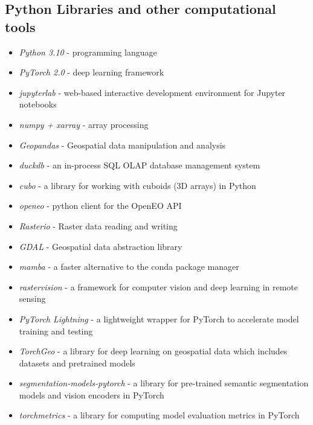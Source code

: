 \begin{multicols}{2}
\subsection{Python Libraries and other computational tools}
\begin{itemize}
    \item \textit{Python 3.10} - programming language  
    \item \textit{PyTorch 2.0} - deep learning framework 
    \item \textit{jupyterlab} - web-based interactive development environment for Jupyter notebooks
    \item \textit{numpy + xarray} - array processing
    \item \textit{Geopandas} - Geospatial data manipulation and analysis
    \item \textit{duckdb} - an in-process SQL OLAP database management system
    \item \textit{cubo} - a library for working with cuboids (3D arrays) in Python
    \item \textit{openeo} - python client for the OpenEO API
    \item \textit{Rasterio} - Raster data reading and writing
    \item \textit{GDAL} - Geospatial data abstraction library
    \item \textit{mamba} - a faster alternative to the conda package manager
    \item \textit{rastervision} - a framework for computer vision and deep learning in remote sensing
    \item \textit{PyTorch Lightning} - a lightweight wrapper for PyTorch to accelerate model training and testing
    \item \textit{TorchGeo} - a library for deep learning on geospatial data which includes datasets and pretrained models
    \item \textit{segmentation-models-pytorch} - a library for pre-trained semantic segmentation models and vision encoders in PyTorch
    \item \textit{torchmetrics} - a library for computing model evaluation metrics in PyTorch
\end{itemize}


\end{multicols}
